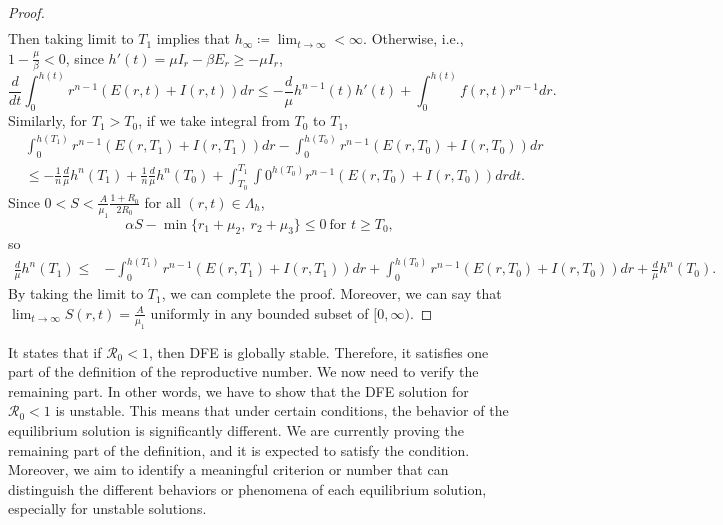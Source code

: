 \documentclass[11pt]{amsart}
\numberwithin{equation}{section}
\theoremstyle{plain}
\theoremstyle{definition}
\begin{document}
\begin{proof}
\begin{equation*}
\begin{aligned}
		\end{aligned}
	\end{equation*}
	Then taking limit to $T_1$ implies that $\displaystyle h_\infty\coloneqq \lim_{t \to \infty}<\infty$. Otherwise, i.e., $1-\frac{\mu}{\beta} < 0$, since $h'(t)=\mu I_r-\beta E_r \geq -\mu I_r$,
	\begin{equation*}
		\frac{d}{dt} \int_0^{h(t)}r^{n-1}(E(r,t)+I(r,t))dr \leq -\frac{d}{\mu} h^{n-1}(t)h'(t)+\int_0^{h(t)}f(r,t)r^{n-1}dr.
	\end{equation*}
	Similarly, for $T_1>T_0$, if we take integral from $T_0$ to $T_1$,
	\begin{equation*}
		\begin{aligned}
			&\int_0^{h(T_1)}r^{n-1}(E(r,T_1)+I(r,T_1))dr-\int_0^{h(T_0)}r^{n-1}(E(r,T_0)+I(r,T_0))dr\\
			&\leq-\frac{1}{n}\frac{d}{\mu}h^n(T_1)+\frac{1}{n}\frac{d}{\mu}h^n(T_0)+\int_{T_0}^{T_1}\int0^{h(T_0)}r^{n-1}(E(r,T_0)+I(r,T_0))drdt.
		\end{aligned}
	\end{equation*}
	Since $0<S<\frac{A}{\mu_1}\frac{1+R_0}{2R_0}$ for all $(r,t) \in \Lambda_h$,
	\begin{equation*}
		\alpha S-\min\{r_1+\mu_2,\ r_2+\mu_3\}\leq0 \ \text{for } t\geq T_0,
	\end{equation*}
	so
	\begin{equation*}
		\begin{aligned}
			\frac{d}{\mu}h^n(T_1)\leq&-\int_0^{h(T_1)}r^{n-1}(E(r,T_1)+I(r,T_1))dr+\int_0^{h(T_0)}r^{n-1}(E(r,T_0)+I(r,T_0))dr+\frac{d}{\mu}h^n(T_0).
		\end{aligned}
	\end{equation*}
	By taking the limit to $T_1$, we can complete the proof. Moreover, we can say that $\displaystyle \lim_{t \to \infty}S(r,t)=\frac{A}{\mu_1}$ uniformly in any bounded subset of $[0,\infty)$.
\end{proof}

It states that if $\mathcal R_0<1$, then DFE is globally stable. Therefore, it satisfies one part of the definition of the reproductive number. We now need to verify the remaining part. In other words, we have to show that the DFE solution for $\mathcal R_0<1$ is unstable. This means that under certain conditions, the behavior of the equilibrium solution is significantly different. We are currently proving the remaining part of the definition, and it is expected to satisfy the condition. Moreover, we aim to identify a meaningful criterion or number that can distinguish the different behaviors or phenomena of each equilibrium solution, especially for unstable solutions.
\end{document}
